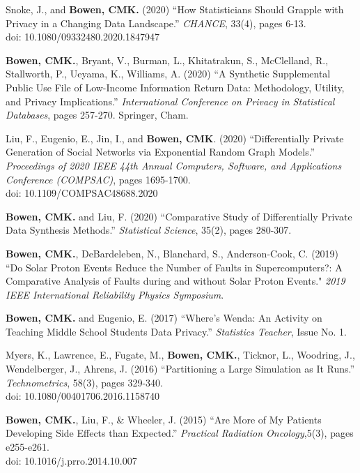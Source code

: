 \documentclass[11pt, letterpaper, roman]{moderncv} %
\begin{document}
\begin{etaremune}[topsep=0pt, itemsep=3pt, partopsep=0pt, parsep=0pt]
    \item Snoke, J., and \textbf{Bowen, CMK.} (2020) ``How Statisticians Should Grapple with Privacy in a Changing Data Landscape.'' \textit{CHANCE}, 33(4), pages 6-13.\\
    doi: 10.1080/09332480.2020.1847947
    
    \item \textbf{Bowen, CMK.}, Bryant, V., Burman, L., Khitatrakun, S., McClelland, R., Stallworth, P., Ueyama, K., Williams, A. (2020) ``A Synthetic Supplemental Public Use File of Low-Income Information Return Data: Methodology, Utility, and Privacy Implications.'' \textit{International Conference on Privacy in Statistical Databases}, pages 257-270. Springer, Cham.
    
    \item Liu, F., Eugenio, E., Jin, I., and \textbf{Bowen, CMK}. (2020) ``Differentially Private Generation of Social Networks via Exponential Random Graph Models.'' \textit{Proceedings of 2020 IEEE 44th Annual Computers, Software, and Applications Conference (COMPSAC)}, pages 1695-1700.\\
    doi: 10.1109/COMPSAC48688.2020

    \item \textbf{Bowen, CMK.} and Liu, F. (2020) ``Comparative Study of Differentially Private Data Synthesis Methods.'' \textit{Statistical Science}, 35(2), pages 280-307.

    \item \textbf{Bowen, CMK.}, DeBardeleben, N., Blanchard, S., Anderson-Cook, C. (2019) ``Do Solar Proton Events Reduce the Number of Faults in Supercomputers?: A Comparative Analysis of Faults during and without Solar Proton Events." \textit{2019 IEEE International Reliability Physics Symposium}.

    \item \textbf{Bowen, CMK.} and Eugenio, E. (2017) ``Where's Wenda:  An Activity on Teaching Middle School Students Data Privacy.'' \textit{Statistics Teacher}, Issue No. 1.
    
    \item Myers, K., Lawrence, E., Fugate, M., \textbf{Bowen, CMK.}, Ticknor, L., Woodring, J., Wendelberger, J., Ahrens, J. (2016) ``Partitioning a Large Simulation as It Runs.'' \textit{Technometrics}, 58(3), pages 329-340. \\
    doi: 10.1080/00401706.2016.1158740

    \item \textbf{Bowen, CMK.}, Liu, F., \& Wheeler, J. (2015) ``Are More of My Patients Developing Side Effects than Expected.'' \textit{Practical Radiation Oncology},5(3), pages e255-e261.\\
    doi: 10.1016/j.prro.2014.10.007
\end{etaremune}
\end{document}
